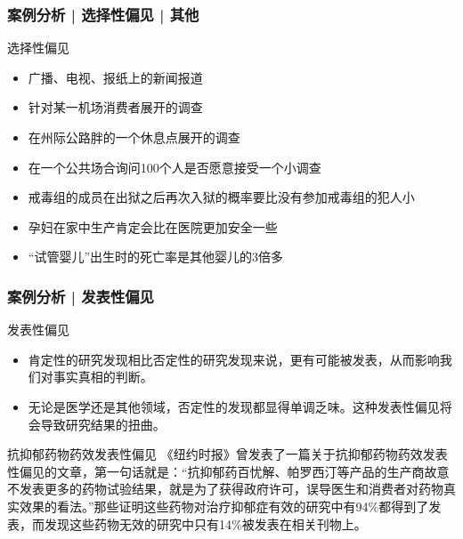 \begin{frame}
  \frametitle{案例分析 | 选择性偏见 | 其他}
  \begin{block}{选择性偏见}
    \begin{itemize}
      \item 广播、电视、报纸上的新闻报道
      \item 针对某一机场消费者展开的调查
      \item 在州际公路胖的一个休息点展开的调查
      \item 在一个公共场合询问100个人是否愿意接受一个小调查
      \item 戒毒组的成员在出狱之后再次入狱的概率要比没有参加戒毒组的犯人小
      \item 孕妇在家中生产肯定会比在医院更加安全一些
      \item “试管婴儿”出生时的死亡率是其他婴儿的3倍多
    \end{itemize}
  \end{block}
\end{frame}

\begin{frame}
  \frametitle{案例分析 | 发表性偏见}
  \begin{block}{发表性偏见}
    \begin{itemize}
      \item 肯定性的研究发现相比否定性的研究发现来说，更有可能被发表，从而影响我们对事实真相的判断。
      \item 无论是医学还是其他领域，否定性的发现都显得单调乏味。这种发表性偏见将会导致研究结果的扭曲。
    \end{itemize}
  \end{block}
  \pause
  \begin{block}{抗抑郁药物药效发表性偏见}
    《纽约时报》曾发表了一篇关于抗抑郁药物药效发表性偏见的文章，第一句话就是：“抗抑郁药百忧解、帕罗西汀等产品的生产商故意不发表更多的药物试验结果，就是为了获得政府许可，误导医生和消费者对药物真实效果的看法。”那些证明这些药物对治疗抑郁症有效的研究中有94\%都得到了发表，而发现这些药物无效的研究中只有14\%被发表在相关刊物上。
  \end{block}
\end{frame}

